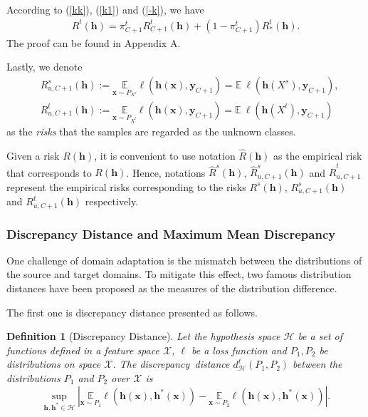 \documentclass[journal]{IEEEtran}
\newtheorem{Definition}{Definition}
\begin{document}
According to (\ref{kk}), (\ref{k1}) and (\ref{-k}), we have
\begin{equation}\label{another}
   \begin{split}
     R^t({\bm h})=\pi^t_{C+1}R^t_{C+1}({\bm h})+(1-\pi_{C+1}^t)R_*^t({\bm h}).
     \end{split}
\end{equation}
 The proof can be found in Appendix A.



Lastly, we denote  
\begin{equation}\label{10000}
\begin{split}
&R^s_{u,C+1}({\bm h}):=\underset{{\mathbf{x}}\sim P_{X^s}}{\mathbb{E}}\ell({\bm h}({\mathbf{x}}),{\mathbf{y}}_{C+1})=\mathbb{E}~\ell({\bm h}(X^s),{\mathbf{y}}_{C+1}),\\&
R^t_{u,C+1}({\bm h}):=\underset{{{\mathbf{x}}\sim P_{X^t}}}{\mathbb{E}}\ell({\bm h}({\mathbf{x}}),{\mathbf{y}}_{C+1})=\mathbb{E}~\ell({\bm h}(X^t),{\mathbf{y}}_{C+1})
\end{split}
\end{equation}
as the {\textit{risks}} that the samples are regarded as the unknown classes. 

Given a risk $R({\bm h})$, it is convenient to use notation $\widehat{R}({\bm h})$ as the empirical risk that corresponds to $R({\bm h})$. Hence, notations $\widehat{{R}}^s({\bm h})$, $\widehat{{R}}^s_{u,C+1}({\bm h})$ and $\widehat{R}^t_{u,C+1}$ represent the empirical risks corresponding to the risks ${{R}}^s({\bm h})$, ${{R}}^s_{u,C+1}({\bm h})$ and ${R}^t_{u,C+1}({\bm h})$ respectively.
\subsubsection{{Discrepancy Distance and Maximum Mean Discrepancy}}
One challenge of domain adaptation is the mismatch between the distributions of the source and target domains. To mitigate this effect, two famous distribution distances have been proposed as the measures of the distribution difference. 

The first one is discrepancy distance presented as follows.
\begin{Definition}[{Discrepancy Distance}\cite{DBLP:conf/colt/MansourMR09}]\label{d0}Let the hypothesis space $\mathcal{H}$ be a set of functions defined in a feature space $\mathcal{X}$,  $\ell$ be a  loss function and $P_1,P_2$ be distributions on space $\mathcal{X}$. The {discrepancy~distance} $d_{\mathcal{H}}^{\ell}(P_1,P_2)$ between the distributions $P_1$ and $P_2$ over $\mathcal{X}$ is
\begin{equation*}
    \underset{{\bm h},{\bm h}^*\in \mathcal{H}}{\sup}|\underset{{{\mathbf{x}}\sim P_1}}{\mathbb{E}}\ell({\bm h}({\mathbf{x}}),{\bm h}^*({\mathbf{x}}))-\underset{{\mathbf{x}}\sim P_2}{\mathbb{E}}\ell({\bm h}({\mathbf{x}}),{\bm h}^*({\mathbf{x}}))|.
\end{equation*}
\end{Definition}
\end{document}
